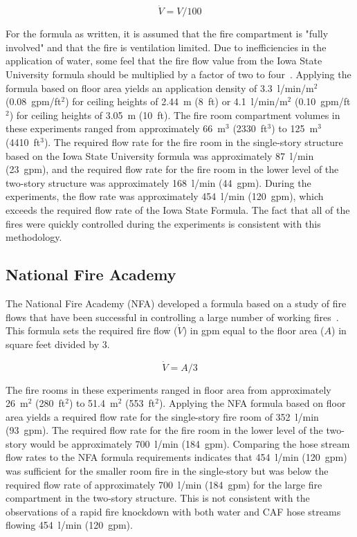 \documentclass[12pt,oneside]{book}
\begin{document}
\begin{equation}\label{eq:isu_form}
\dot{V} = V / 100
\end{equation}

For the formula as written, it is assumed that the fire compartment is "fully involved" and that the fire is ventilation limited.  Due to inefficiencies in the application of water, some feel that the fire flow value from the Iowa State University formula should be multiplied by a factor of two to four~\cite{NFPA}. Applying the formula based on floor area yields an application density of 3.3~l/min/m$^2$ (0.08~gpm/ft$^2$) for ceiling heights of 2.44~m (8~ft) or 4.1~l/min/m$^2$ (0.10~gpm/ft$^2$) for ceiling heights of 3.05~m (10~ft). The fire room compartment volumes in these experiments ranged from approximately 66~m$^3$ (2330~ft$^3$) to 125~m$^3$ (4410~ft$^3$). The required flow rate for the fire room in the single-story structure based on the Iowa State University formula was approximately 87~l/min (23~gpm), and the required flow rate for the fire room in the lower level of the two-story structure was approximately 168~l/min (44~gpm). During the experiments, the flow rate was approximately 454~l/min (120~gpm), which exceeds the required flow rate of the Iowa State Formula. The fact that all of the fires were quickly controlled during the experiments is consistent with this methodology. 

\subsection{National Fire Academy}
The National Fire Academy (NFA) developed a formula based on a study of fire flows that have been successful in controlling a large number of working fires~\cite{Klaene:1}. This formula sets the required fire flow ($\dot{V}$) in gpm equal to the floor area ($A$) in square feet divided by 3.

\begin{equation}\label{eq:nfa_form}
\dot{V} = A / 3
\end{equation}

The fire rooms in these experiments ranged in floor area from approximately 26~m$^2$ (280~ft$^2$) to 51.4~m$^2$ (553~ft$^2$). Applying the NFA formula based on floor area yields a required flow rate for the single-story fire room of 352~l/min (93~gpm). The required flow rate for the fire room in the lower level of the two-story would be approximately 700~l/min (184~gpm). Comparing the hose stream flow rates to the NFA formula requirements indicates that 454~l/min (120~gpm) was sufficient for the smaller room fire in the single-story but was below the required flow rate of approximately 700~l/min (184~gpm) for the large fire compartment in the two-story structure. This is not consistent with the observations of a rapid fire knockdown with both water and CAF hose streams flowing 454~l/min (120~gpm). 
\end{document}
